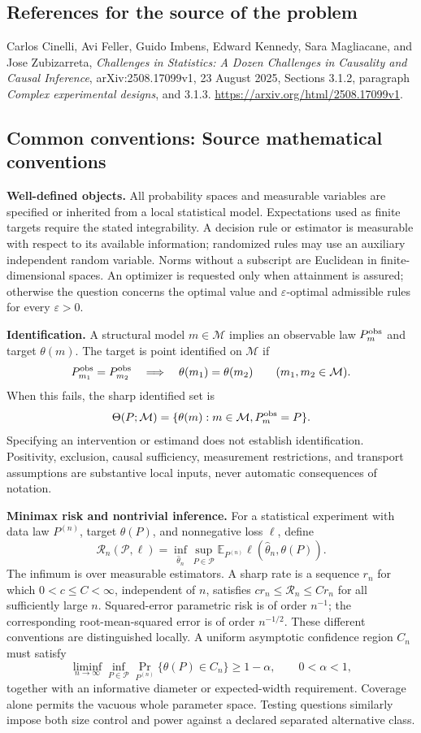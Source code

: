 \documentclass[11pt,a4paper]{article}
\newcommand{\E}{\mathbb E}
\begin{document}
\subsection*{References for the source of the problem}
Carlos Cinelli, Avi Feller, Guido Imbens, Edward Kennedy, Sara Magliacane, and Jose Zubizarreta, \emph{Challenges in Statistics: A Dozen Challenges in Causality and Causal Inference}, arXiv:2508.17099v1, 23 August 2025, Sections 3.1.2, paragraph \emph{Complex experimental designs}, and 3.1.3. \url{https://arxiv.org/html/2508.17099v1}.

\subsection*{Common conventions: Source mathematical conventions}

\textbf{Well-defined objects.}
All probability spaces and measurable variables are specified or inherited
from a local statistical model. Expectations used as finite targets require
the stated integrability. A decision rule or estimator is measurable with
respect to its available information; randomized rules may use an auxiliary
independent random variable. Norms without a subscript are Euclidean in
finite-dimensional spaces. An optimizer is requested only when attainment
is assured; otherwise the question concerns the optimal value and
$\varepsilon$-optimal admissible rules for every $\varepsilon>0$.

\textbf{Identification.}
A structural model $m\in\mathcal M$ implies an observable law
$P_m^{\rm obs}$ and target $\theta(m)$. The target is point identified on
$\mathcal M$ if
\[
 P_{m_1}^{\rm obs}=P_{m_2}^{\rm obs}
 \quad\Longrightarrow\quad\theta(m_1)=\theta(m_2)
 \qquad(m_1,m_2\in\mathcal M).
\]
When this fails, the sharp identified set is
\[
 \Theta(P;\mathcal M)=\{\theta(m):m\in\mathcal M,
                                  P_m^{\rm obs}=P\}.
\]
Specifying an intervention or estimand does not establish identification.
Positivity, exclusion, causal sufficiency, measurement restrictions, and
transport assumptions are substantive local inputs, never automatic
consequences of notation.

\textbf{Minimax risk and nontrivial inference.}
For a statistical experiment with data law $P^{(n)}$, target $\theta(P)$,
and nonnegative loss $\ell$, define
\[
 \mathcal R_n(\mathcal P,\ell)
   =\inf_{\widehat\theta_n}\sup_{P\in\mathcal P}
      \E_{P^{(n)}}\ell(\widehat\theta_n,\theta(P)).
\]
The infimum is over measurable estimators. A sharp rate is a sequence
$r_n$ for which $0<c\leq C<\infty$, independent of $n$, satisfies
$c r_n\leq\mathcal R_n\leq C r_n$ for all sufficiently large $n$.
Squared-error parametric risk is of order $n^{-1}$; the corresponding
root-mean-squared error is of order $n^{-1/2}$. These different conventions
are distinguished locally. A uniform asymptotic confidence region $C_n$
must satisfy
\[
 \liminf_{n\to\infty}\inf_{P\in\mathcal P}
     \Pr_{P^{(n)}}\{\theta(P)\in C_n\}\geq 1-\alpha,
 \qquad 0<\alpha<1,
\]
together with an informative diameter or expected-width requirement.
Coverage alone permits the vacuous whole parameter space. Testing questions
similarly impose both size control and power against a declared separated
alternative class.
\end{document}
